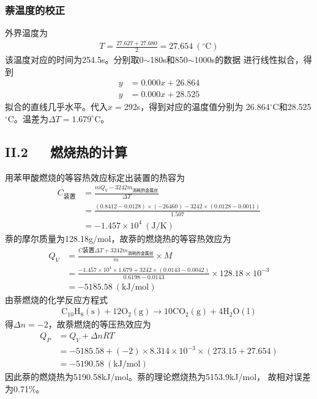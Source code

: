 \documentclass[12pt]{ctexart}
\numberwithin{equation}{section}
\begin{document}
\subsubsection*{萘温度的校正}
外界温度为
\begin{align*}
    T = \frac{27.627 + 27.680}{2} = 27.654~(^\circ\mathrm{C})
\end{align*}
该温度对应的时间为254.5s。分别取0$\sim$180s和850$\sim$1000s的数据
进行线性拟合，得到
\begin{align*}
    y &= 0.000x + 26.864 \\
    y &= 0.000x + 28.525
\end{align*}
拟合的直线几乎水平。代入$x = $292s，得到对应的温度值分别为
26.864$^\circ$C和28.525$^\circ$C。温差为$\Delta T = 1.679^\circ$C。

\subsection*{II.2~~~燃烧热的计算}
用苯甲酸燃烧的等容热效应标定出装置的热容为
\begin{align*}
    C_{\text{装置}} &= \frac{mQ_V - 3242m_{\text{消耗的金属丝}}}{\Delta T} \\
    &= \frac{(0.8412 - 0.0128)\times (-26460) - 3242\times (0.0128 - 0.0011)}{1.507} \\
    &= -1.457\times 10^4~(\mathrm{J/K})
\end{align*}
萘的摩尔质量为128.18g/mol，故萘的燃烧热的等容热效应为
\begin{align*}
    Q_V &= \frac{C{\text{装置}\Delta T + 3242m_{\text{消耗的金属丝}}}}{m}\times M \\
    &= \frac{-1.457\times 10^4\times 1.679 + 3242\times(0.0143-0.0042)}{0.6198 - 0.0143} \times 128.18\times 10^{-3} \\
    &= -5185.58~(\mathrm{kJ/mol})
\end{align*}
由萘燃烧的化学反应方程式
\begin{align*}
    \mathrm{C_{10}H_8(s) + 12O_2(g) \rightarrow 10CO_2(g) + 4H_2O(l)}
\end{align*}
得$\Delta n = -2$，故萘燃烧的等压热效应为
\begin{align*}
    Q_P &= Q_V + \Delta nRT \\
    &= -5185.58 + (-2)\times 8.314 \times 10^{-3} \times (273.15 + 27.654) \\
    &= -5190.58~\mathrm{(kJ/mol)}
\end{align*}
因此萘的燃烧热为5190.58kJ/mol。萘的理论燃烧热为5153.9kJ/mol，
故相对误差为0.71\%。
\end{document}

